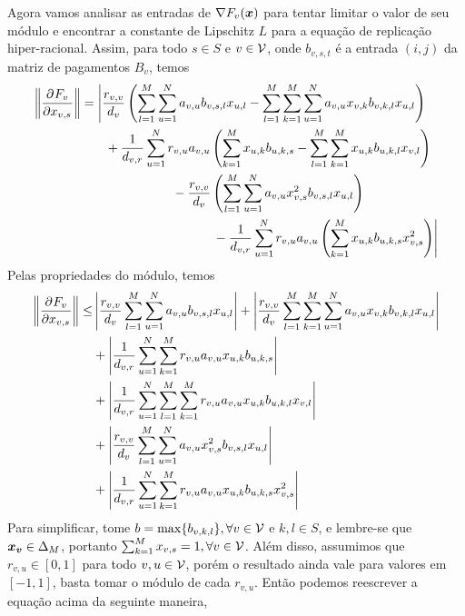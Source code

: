 Agora vamos analisar as entradas de $\nabla F_v(\boldsymbol{x})$ para tentar limitar o valor de seu módulo e encontrar a constante de Lipschitz $L$ para a equação de replicação hiper-racional. Assim, para todo $s\in S$ e $v\in\mathcal{V}$, onde $b_{v,s,t}$ é a entrada $(i,j)$ da matriz de pagamentos $B_v$, temos
\begin{equation}
    \left\|\pdv{F_v}{x_{v,s}}\right\| = \!\begin{multlined}[t]
        \Biggl| \frac{r_{v,v}}{d_v} \left( 
        \sum^M_{l=1}\sum^N_{u=1} a_{v,u}b_{v,s,l}x_{u,l} - \sum^M_{l=1}\sum^M_{k=1}\sum^N_{u=1} a_{v,u}x_{v,k}b_{v,k,l}x_{u,l} \right) \\
        + \frac{1}{d_{v,r}}\sum^N_{u=1}r_{v,u}a_{v,u}\left( \sum^M_{k=1}x_{u,k}b_{u,k,s} - \sum^M_{l=1}\sum^M_{k=1}x_{u,k}b_{u,k,l}x_{v,l}\right) \\
        - \frac{r_{v,v}}{d_v}\left( \sum^M_{l=1}\sum^N_{u=1} a_{v,u}x_{v,s}^2b_{v,s,l}x_{u,l} \right)  \\
        - \frac{1}{d_{v,r}}\sum^N_{u=1}r_{v,u}a_{v,u}
        \left( \sum^M_{k=1}x_{u,k}b_{u,k,s}x_{v,s}^2\right) \Biggr|
    \end{multlined}
\end{equation}
Pelas propriedades do módulo, temos
\begin{equation}
\begin{split}
    \left\|\frac{\partial^{}F_v}{\partial {x_{v,s}}^{}}\right\| \leq &
    \left| \frac{r_{v,v}}{d_v}\sum^M_{l=1}\sum^N_{u=1} a_{v,u}b_{v,s,l}x_{u,l} \right| + \left| \frac{r_{v,v}}{d_v}\sum^M_{l=1}\sum^M_{k=1}\sum^N_{u=1} a_{v,u}x_{v,k}b_{v,k,l}x_{u,l} \right| \\
    &+ \left|\frac{1}{d_{v,r}}\sum^N_{u=1} \sum^M_{k=1} r_{v,u}a_{v,u} x_{u,k}b_{u,k,s} \right| \\&+ 
    \left|\frac{1}{d_{v,r}}\sum^N_{u=1}\sum^M_{l=1}\sum^M_{k=1} r_{v,u}a_{v,u}x_{u,k}b_{u,k,l}x_{v,l}\right| \\&+
    \left|\frac{r_{v,v}}{d_v} \sum^M_{l=1}\sum^N_{u=1} a_{v,u}x_{v,s}^2b_{v,s,l}x_{u,l} \right| \\
    &+ \left| \frac{1}{d_{v,r}}\sum^N_{u=1}\sum^M_{k=1} r_{v,u}a_{v,u}x_{u,k}b_{u,k,s}x_{v,s}^2\right|
\end{split}
\end{equation}
Para simplificar, tome $b=\max\{b_{v,k,l}\},\forall v\in\mathcal{V}$ e $k,l\in S$, e lembre-se que $\boldsymbol{x_v}\in\Delta_M$, portanto $\sum_{k=1}^M x_{v,s}=1,\forall v\in\mathcal{V}$. Além disso, assumimos que $r_{v,u}\in[0,1]$ para todo $v,u\in\mathcal{V}$, porém o resultado ainda vale para valores em $[-1,1]$, basta tomar o módulo de cada $r_{v,u}$. Então podemos reescrever a equação acima da seguinte maneira,
